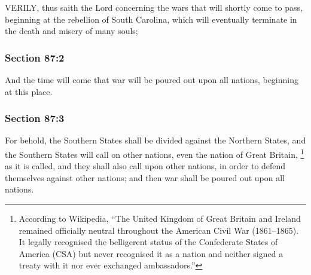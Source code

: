 		VERILY, thus saith the Lord concerning the wars that will shortly come to pass, beginning at the rebellion of South Carolina, which will eventually terminate in the death and misery of many souls;


	\subsubsection{Section 87:2} %
		\label{DC87-2}

		And the time will come that war will be poured out upon all nations, beginning at this place.


	\subsubsection{Section 87:3} %
		\label{DC87-3}

		For behold, the Southern States shall be divided against the Northern States, and the Southern States will call on other nations, even the nation of Great Britain,%
			\footnote{%
				According to Wikipedia, ``The United Kingdom of Great Britain and Ireland remained officially neutral throughout the American Civil War (1861--1865). It legally recognised the belligerent status of the Confederate States of America (CSA) but never recognised it as a nation and neither signed a treaty with it nor ever exchanged ambassadors.''
				}
		as it is called, and they shall also call upon other nations, in order to defend themselves against other nations; and then war shall be poured out upon all nations.


